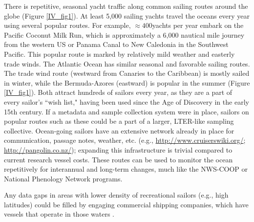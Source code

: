 There is repetitive, seasonal yacht traffic along common sailing routes around the globe (Figure \ref{IV_fig1}). At least 5,000 sailing yachts travel the oceans every year using several popular routes. For example, $\approx 400$yachts per year embark on the Pacific Coconut Milk Run, which is approximately a 6,000 nautical mile journey from the western US or Panama Canal to New Caledonia in the Southwest Pacific. This popular route is marked by relatively mild weather and easterly trade winds. The Atlantic Ocean has similar seasonal and favorable sailing routes. The trade wind route (westward from Canaries to the Caribbean) is mostly sailed in winter, while the Bermuda-Azores (eastward) is popular in the summer (Figure \ref{IV_fig1}). Both attract hundreds of sailors every year, as they are a part of every sailor's ``wish list," having been used since the Age of Discovery in the early 15th century. If a metadata and sample collection system were in place, sailors on popular routes such as these could be a part of a larger, LTER-like sampling collective. Ocean-going sailors have an extensive network already in place for communication, passage notes, weather, etc. (e.g., \url{http://www.cruiserswiki.org/}; \url{http://pangolin.co.nz/}); expanding this infrastructure is trivial compared to current research vessel costs. These routes can be used to monitor the ocean repetitively for interannual and long-term changes, much like the NWS-COOP or National Phenology Network programs.

Any data gaps in areas with lower density of recreational sailors (e.g., high latitudes) could be filled by engaging commercial shipping companies, which have vessels that operate in those waters \cite{kaluza_complex_2010}.